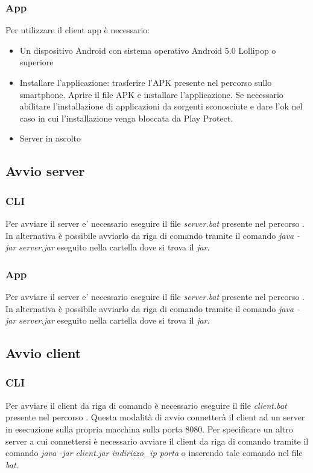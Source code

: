 \subsubsection{App}
\noindent Per utilizzare il client app è necessario:
\begin{itemize}[label=-]
  \item Un dispositivo Android con sistema operativo Android 5.0 Lollipop o superiore
  \item Installare l'applicazione: trasferire l'APK presente nel percorso  sullo smartphone. Aprire il file APK e installare l'applicazione. Se necessario abilitare l'installazione di applicazioni da sorgenti sconosciute e dare l'ok nel caso in cui l'installazione venga bloccata da Play Protect.
  \item Server in ascolto
\end{itemize}


\subsection{Avvio server}
\subsubsection{CLI}
\noindent Per avviare il server e' necessario eseguire il file \textit{server.bat} presente nel percorso . In alternativa è possibile avviarlo da riga di comando tramite il comando \textit{java -jar server.jar} eseguito nella cartella dove si trova il \textit{jar}.

\subsubsection{App}
\noindent Per avviare il server e' necessario eseguire il file \textit{server.bat} presente nel percorso . In alternativa è possibile avviarlo da riga di comando tramite il comando \textit{java -jar server.jar} eseguito nella cartella dove si trova il \textit{jar}.

\subsection{Avvio client}
\subsubsection{CLI}
\noindent Per avviare il client da riga di comando è necessario eseguire il file \textit{client.bat} presente nel percorso . Questa modalità di avvio connetterà il client ad un server in esecuzione sulla propria macchina sulla porta 8080. Per specificare un altro server a cui connettersi è necessario
avviare il client da riga di comando tramite il comando \textit{java -jar client.jar indirizzo\_ip porta} o inserendo tale comando nel file \textit{bat}.


